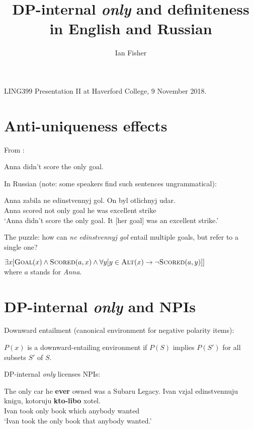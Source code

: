 \documentclass{article}
\title{DP-internal \textit{only} and definiteness in English and Russian}
\author{Ian Fisher}
\date{}
\begin{document}
\maketitle

\noindent LING399 Presentation II at Haverford College, 9 November 2018.

\section{Anti-uniqueness effects}
From \citet{cb2015}:

\begin{exe}
	\ex Anna didn't score the only goal.
\end{exe}

\noindent In Russian (note: some speakers find such sentences ungrammatical):
\begin{exe}
	\ex \gll Anna zabila ne edinstvennyj gol. On byl otlichnyj udar.\\
	Anna scored not only goal he was excellent strike\\
	\glt `Anna didn't score the only goal. It [her goal] was an excellent strike.'
\end{exe}

\noindent The puzzle: how can \textit{ne edinstvennyj gol} entail multiple goals, but refer to a single one?

\begin{exe}
	\ex $\exists x [ \textsc{Goal}(x) \land \textsc{Scored}(a, x) \land \forall y [ y \in \textsc{Alt}(x) \to \neg \textsc{Scored}(a, y)] ]$\\ where $a$ stands for \textit{Anna}.
\end{exe}


\section{DP-internal \textit{only} and NPIs}
Downward entailment (canonical environment for negative polarity items):

\begin{exe}
	\ex $P(x)$ is a downward-entailing environment if $P(S)$ implies $P(S')$ for all subsets $S'$ of $S$.
\end{exe}

\noindent DP-internal \textit{only} licenses NPIs:

\begin{exe}
	\ex The only car he \textbf{ever} owned was a Subaru Legacy.
	\ex \gll Ivan vzjal edinstvennuju knigu, kotoruju \textbf{kto-libo} xotel.\\
	Ivan took only book which anybody wanted\\
	\glt `Ivan took the only book that anybody wanted.'
\end{exe}
\end{document}
